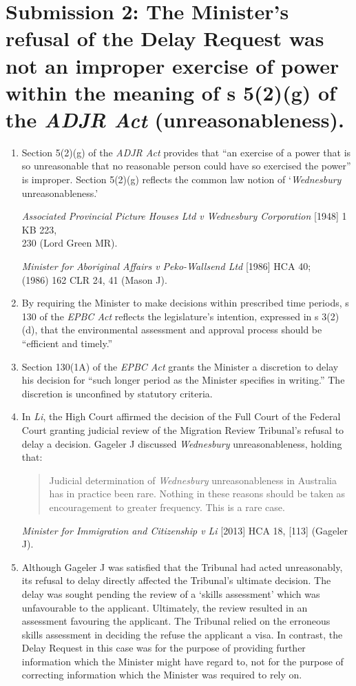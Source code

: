 \documentclass[12pt]{article}
\begin{document}
\section{Submission 2: The Minister's refusal of the Delay Request was
not an improper exercise of power within the meaning of s 5(2)(g) of the
\emph{ADJR Act} (unreasonableness).}

\begin{enumerate}[1.]
\item
  Section 5(2)(g) of the \emph{ADJR Act} provides that ``an exercise of
  a power that is so unreasonable that no reasonable person could have
  so exercised the power'' is improper. Section 5(2)(g) reflects the
  common law notion of `\emph{Wednesbury} unreasonableness.'

  \emph{Associated Provincial Picture Houses Ltd v Wednesbury
  Corporation} {[}1948{]} 1 KB 223, \\ 230 (Lord Green MR).

  \emph{Minister for Aboriginal Affairs v Peko-Wallsend Ltd} {[}1986{]}
  HCA 40; \\(1986) 162 CLR 24, 41 (Mason J).
\item
  By requiring the Minister to make decisions within prescribed time
  periods, s 130 of the \emph{EPBC Act} reflects the legislature's
  intention, expressed in s 3(2)(d), that the environmental assessment
  and approval process should be ``efficient and timely.''
\item
  Section 130(1A) of the \emph{EPBC Act} grants the Minister a
  discretion to delay his decision for ``such longer period as the
  Minister specifies in writing.'' The discretion is unconfined by
  statutory criteria.
\item
  In \emph{Li}, the High Court affirmed the decision of the Full Court
  of the Federal Court granting judicial review of the Migration Review
  Tribunal's refusal to delay a decision. Gageler J discussed
  \emph{Wednesbury} unreasonableness, holding that:

  \begin{quote}
  Judicial determination of \emph{Wednesbury} unreasonableness in
  Australia has in practice been rare. Nothing in these reasons should
  be taken as encouragement to greater frequency. This is a rare case.
  \end{quote}

  \emph{Minister for Immigration and Citizenship v Li} {[}2013{]} HCA
  18, {[}113{]} (Gageler J).
\item
  Although Gageler J was satisfied that the Tribunal had acted
  unreasonably, its refusal to delay directly affected the Tribunal's
  ultimate decision. The delay was sought pending the review of a
  `skills assessment' which was unfavourable to the applicant.
  Ultimately, the review resulted in an assessment favouring the
  applicant. The Tribunal relied on the erroneous skills assessment in
  deciding the refuse the applicant a visa. In contrast, the Delay
  Request in this case was for the purpose of providing further
  information which the Minister might have regard to, not for the
  purpose of correcting information which the Minister was required to
  rely on.


\end{enumerate}
\end{document}
